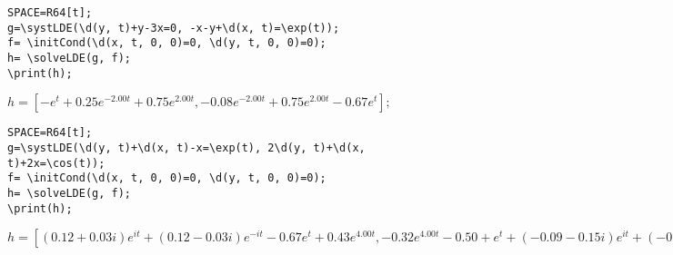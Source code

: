 \begin{verbatim}
SPACE=R64[t];
g=\systLDE(\d(y, t)+y-3x=0, -x-y+\d(x, t)=\exp(t));
f= \initCond(\d(x, t, 0, 0)=0, \d(y, t, 0, 0)=0);
h= \solveLDE(g, f);  
\print(h);
\end{verbatim}

{$h = [-e^{t}+0.25e^{-2.00t}+0.75e^{2.00t},-0.08e^{-2.00t}+0.75e^{2.00t}-0.67e^{t}];$}

\begin{verbatim}
SPACE=R64[t];
g=\systLDE(\d(y, t)+\d(x, t)-x=\exp(t), 2\d(y, t)+\d(x, t)+2x=\cos(t));
f= \initCond(\d(x, t, 0, 0)=0, \d(y, t, 0, 0)=0);
h= \solveLDE(g, f);  
\print(h);
\end{verbatim}

{$h = [(0.12+0.03i)e^{it}+(0.12-0.03i)e^{-it}-0.67e^{t}+0.43e^{4.00t},
-0.32e^{4.00t}-0.50+e^{t}+(-0.09-0.15i)e^{it}+(-0.09+0.15i)e^{-it}];$}

